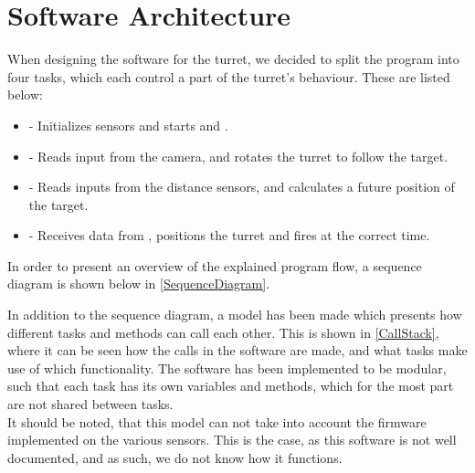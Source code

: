 \section{Software Architecture}
When designing the software for the turret, we decided to split the program
into four tasks, which each control a part of the turret's behaviour. These are
listed below:

\begin{itemize}\label{softArchOver}
  \item {} - Initializes sensors and starts  and
  .
  \item {} - Reads input from the camera, and rotates the turret to
  follow the target.
  \item {} - Reads inputs from the distance sensors,
  and calculates a future position of the target.
  \item {} - Receives data from ,
  positions the turret and fires at the correct time.
\end{itemize}

In order to present an overview of the explained program flow, a sequence
diagram is shown below in \autoref{SequenceDiagram}.

\newpage
In addition to the sequence diagram, a model has been made which presents how
different tasks and methods can call each other. This is shown in
\autoref{CallStack}, where it can be seen how the calls in the software are
made, and what tasks make use of which functionality. The software has been
implemented to be modular, such that each task has its own variables and
methods, which for the most part are not shared between tasks.\\
It should be noted, that this model can not take into account the firmware
implemented on the various sensors. This is the case, as this software is not
well documented, and as such, we do not know how it functions.


